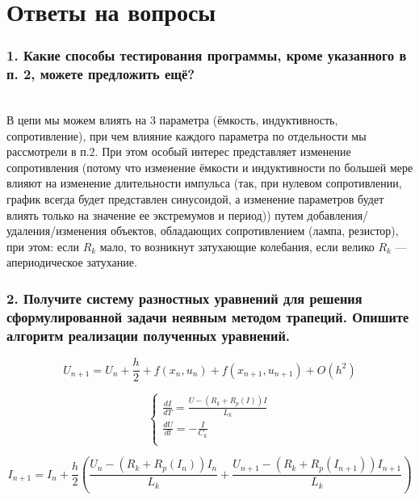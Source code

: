 \chapter{Ответы на вопросы}

\subsection*{1. Какие способы тестирования программы, кроме указанного в п. 2, можете предложить ещё?}\\

В цепи мы можем влиять на 3 параметра (ёмкость, индуктивность, сопротивление), при чем влияние каждого параметра по отдельности мы рассмотрели в п.2. При этом особый интерес представляет изменение сопротивления (потому что изменение ёмкости и индуктивности по большей мере влияют на изменение длительности импульса (так, при нулевом сопротивлении, график всегда будет представлен синусоидой, а изменение параметров будет влиять только на значение ее экстремумов и период)) путем добавления/удаления/изменения объектов, обладающих сопротивлением (лампа, резистор), при этом: если $R_{k}$ мало, то возникнут затухающие колебания, если велико $R_{k}$ --- апериодическое затухание.\\

\subsection*{2. Получите систему разностных уравнений для решения сформулированной задачи неявным методом трапеций. Опишите  алгоритм реализации полученных уравнений.}

\begin{equation}
    U_{n + 1} = U_{n} + \frac{h}{2} + f(x_{n}, u_{n}) + f(x_{n + 1}, u_{n + 1}) + O(h^2)
\end{equation}

\begin{equation}
    \begin{cases}
        \frac{dI}{dT} = \frac{U - (R_{k} + R_{p}(I))I}{L_{k}}\\
        \frac{dU}{dt} = -\frac{I}{C_{k}}\\
    \end{cases}
\end{equation}

\begin{equation}
    I_{n + 1} = I_{n} + \frac{h}{2} (\frac{U_{n} - (R_{k} + R_{p}(I_{n}))I_{n}}{L_{k}} + \frac{U_{n + 1} - (R_{k} + R_{p}(I_{n + 1}))I_{n + 1}}{L_{k}})
\end{equation}

